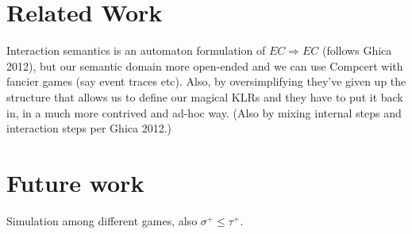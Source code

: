 \documentclass[acmsmall,anonymous]{acmart}
\begin{document}

\newpage
\section{Related Work} %

Interaction semantics is an automaton formulation of $EC \Rightarrow EC$
(follows Ghica 2012),
but our semantic domain more open-ended and
we can use Compcert with fancier games
(say event traces etc).
Also,
by oversimplifying they've given up the structure
that allows us to define our magical KLRs
and they have to put it back in,
in a much more contrived and ad-hoc way.
(Also by mixing internal steps and interaction steps per Ghica 2012.)


\newpage
\section{Future work} %

Simulation among different games,
also $\sigma^+ \le \tau^+$.



\end{document}
